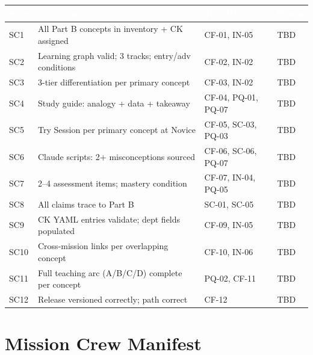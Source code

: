 \documentclass[11pt,letterpaper]{article}
\newcommand{\tableheader}[1]{\textbf{\sffamily\textcolor{white}{#1}}}
\begin{document}
\begin{center}
\begin{tabularx}{\textwidth}{L{1cm}L{5cm}L{3cm}C{1.5cm}}
\toprule
{}
\tableheader{SC\#} & \tableheader{Criterion} & \tableheader{Test IDs} & \tableheader{Status} \\
\midrule
SC1 & All Part B concepts in inventory + CK assigned & CF-01, IN-05 & TBD \\
SC2 & Learning graph valid; 3 tracks; entry/adv conditions & CF-02, IN-02 & TBD \\
SC3 & 3-tier differentiation per primary concept & CF-03, IN-02 & TBD \\
SC4 & Study guide: analogy + data + takeaway & CF-04, PQ-01, PQ-07 & TBD \\
SC5 & Try Session per primary concept at Novice & CF-05, SC-03, PQ-03 & TBD \\
SC6 & Claude scripts: 2+ misconceptions sourced & CF-06, SC-06, PQ-07 & TBD \\
SC7 & 2--4 assessment items; mastery condition & CF-07, IN-04, PQ-05 & TBD \\
SC8 & All claims trace to Part B & SC-01, SC-05 & TBD \\
SC9 & CK YAML entries validate; dept fields populated & CF-09, IN-05 & TBD \\
SC10 & Cross-mission links per overlapping concept & CF-10, IN-06 & TBD \\
SC11 & Full teaching arc (A/B/C/D) complete per concept & PQ-02, CF-11 & TBD \\
SC12 & Release versioned correctly; path correct & CF-12 & TBD \\
\bottomrule
\end{tabularx}
\end{center}

\section{Mission Crew Manifest}
\end{document}
